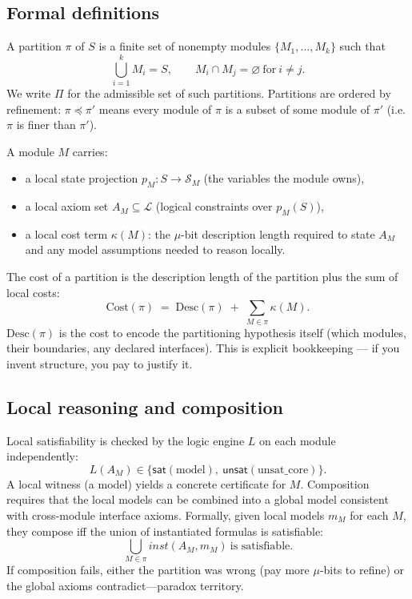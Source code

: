 \documentclass[11pt]{article}
\begin{document}
\subsection{Formal definitions}
A partition $\pi$ of $S$ is a finite set of nonempty modules $\{M_1,\dots,M_k\}$ such that
\[
\bigcup_{i=1}^k M_i = S,\qquad M_i \cap M_j = \varnothing\ \text{for}\ i\neq j.
\]
We write $\Pi$ for the admissible set of such partitions. Partitions are ordered by refinement: $\pi \preceq \pi'$ means every module of $\pi$ is a subset of some module of $\pi'$ (i.e. $\pi$ is finer than $\pi'$).

A module $M$ carries:
\begin{itemize}
  \item a local state projection $p_M : S \to \mathcal{S}_M$ (the variables the module owns),
  \item a local axiom set $A_M \subseteq \mathcal{L}$ (logical constraints over $p_M(S)$),
  \item a local cost term $\kappa(M)$: the $\mu$-bit description length required to state $A_M$ and any model assumptions needed to reason locally.
\end{itemize}

The cost of a partition is the description length of the partition plus the sum of local costs:
\[
\mathrm{Cost}(\pi) \;=\; \mathrm{Desc}(\pi)\;+\;\sum_{M\in\pi}\kappa(M).
\]
$\mathrm{Desc}(\pi)$ is the cost to encode the partitioning hypothesis itself (which modules, their boundaries, any declared interfaces). This is explicit bookkeeping — if you invent structure, you pay to justify it.

\subsection{Local reasoning and composition}
Local satisfiability is checked by the logic engine $L$ on each module independently:
\[
L(A_M) \in \{\mathsf{sat}(\text{model}),\ \mathsf{unsat}(\text{unsat\_core})\}.
\]
A local witness (a model) yields a concrete certificate for $M$. Composition requires that the local models can be combined into a global model consistent with cross-module interface axioms. Formally, given local models $m_M$ for each $M$, they compose iff the union of instantiated formulas is satisfiable:
\[
\bigcup_{M\in\pi} \mathit{inst}(A_M,m_M)\ \text{is satisfiable}.
\]
If composition fails, either the partition was wrong (pay more $\mu$-bits to refine) or the global axioms contradict—paradox territory.
\end{document}
